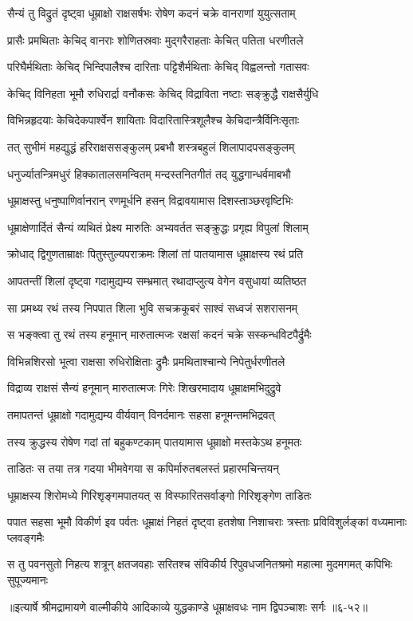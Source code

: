 \twolineshloka
{सैन्यं तु विद्रुतं दृष्ट्वा धूम्राक्षो राक्षसर्षभः}
{रोषेण कदनं चक्रे वानराणां युयुत्सताम्} %

\twolineshloka
{प्रासैः प्रमथिताः केचिद् वानराः शोणितस्रवाः}
{मुद्गरैराहताः केचित् पतिता धरणीतले} %

\twolineshloka
{परिघैर्मथिताः केचिद् भिन्दिपालैश्च दारिताः}
{पट्टिशैर्मथिताः केचिद् विह्वलन्तो गतासवः} %

\twolineshloka
{केचिद् विनिहता भूमौ रुधिरार्द्रा वनौकसः}
{केचिद् विद्राविता नष्टाः सङ्क्रुद्धै राक्षसैर्युधि} %

\twolineshloka
{विभिन्नहृदयाः केचिदेकपार्श्वेन शायिताः}
{विदारितास्त्रिशूलैश्च केचिदान्त्रैर्विनिःसृताः} %

\twolineshloka
{तत् सुभीमं महद्युद्धं हरिराक्षससङ्कुलम्}
{प्रबभौ शस्त्रबहुलं शिलापादपसङ्कुलम्} %

\twolineshloka
{धनुर्ज्यातन्त्रिमधुरं हिक्कातालसमन्वितम्}
{मन्दस्तनितगीतं तद् युद्धगान्धर्वमाबभौ} %

\twolineshloka
{धूम्राक्षस्तु धनुष्पाणिर्वानरान् रणमूर्धनि}
{हसन् विद्रावयामास दिशस्ताञ्छरवृष्टिभिः} %

\twolineshloka
{धूम्राक्षेणार्दितं सैन्यं व्यथितं प्रेक्ष्य मारुतिः}
{अभ्यवर्तत सङ्क्रुद्धः प्रगृह्य विपुलां शिलाम्} %

\twolineshloka
{क्रोधाद् द्विगुणताम्राक्षः पितुस्तुल्यपराक्रमः}
{शिलां तां पातयामास धूम्राक्षस्य रथं प्रति} %

\twolineshloka
{आपतन्तीं शिलां दृष्ट्वा गदामुद्यम्य सम्भ्रमात्}
{रथादाप्लुत्य वेगेन वसुधायां व्यतिष्ठत} %

\twolineshloka
{सा प्रमथ्य रथं तस्य निपपात शिला भुवि}
{सचक्रकूबरं साश्वं सध्वजं सशरासनम्} %

\twolineshloka
{स भङ्क्त्वा तु रथं तस्य हनूमान् मारुतात्मजः}
{रक्षसां कदनं चक्रे सस्कन्धविटपैर्द्रुमैः} %

\twolineshloka
{विभिन्नशिरसो भूत्वा राक्षसा रुधिरोक्षिताः}
{द्रुमैः प्रमथिताश्चान्ये निपेतुर्धरणीतले} %

\twolineshloka
{विद्राव्य राक्षसं सैन्यं हनूमान् मारुतात्मजः}
{गिरेः शिखरमादाय धूम्राक्षमभिदुद्रुवे} %

\twolineshloka
{तमापतन्तं धूम्राक्षो गदामुद्यम्य वीर्यवान्}
{विनर्दमानः सहसा हनूमन्तमभिद्रवत्} %

\twolineshloka
{तस्य क्रुद्धस्य रोषेण गदां तां बहुकण्टकाम्}
{पातयामास धूम्राक्षो मस्तकेऽथ हनूमतः} %

\twolineshloka
{ताडितः स तया तत्र गदया भीमवेगया}
{स कपिर्मारुतबलस्तं प्रहारमचिन्तयन्} %

\twolineshloka
{धूम्राक्षस्य शिरोमध्ये गिरिशृङ्गमपातयत्}
{स विस्फारितसर्वाङ्गो गिरिशृङ्गेण ताडितः} %

\threelineshloka
{पपात सहसा भूमौ विकीर्ण इव पर्वतः}
{धूम्राक्षं निहतं दृष्ट्वा हतशेषा निशाचराः}
{त्रस्ताः प्रविविशुर्लङ्कां वध्यमानाः प्लवङ्गमैः} %

\twolineshloka
{स तु पवनसुतो निहत्य शत्रून् क्षतजवहाः सरितश्च संविकीर्य}
{रिपुवधजनितश्रमो महात्मा मुदमगमत् कपिभिः सुपूज्यमानः} %


॥इत्यार्षे श्रीमद्रामायणे वाल्मीकीये आदिकाव्ये युद्धकाण्डे धूम्राक्षवधः नाम द्विपञ्चाशः सर्गः ॥६-५२॥
